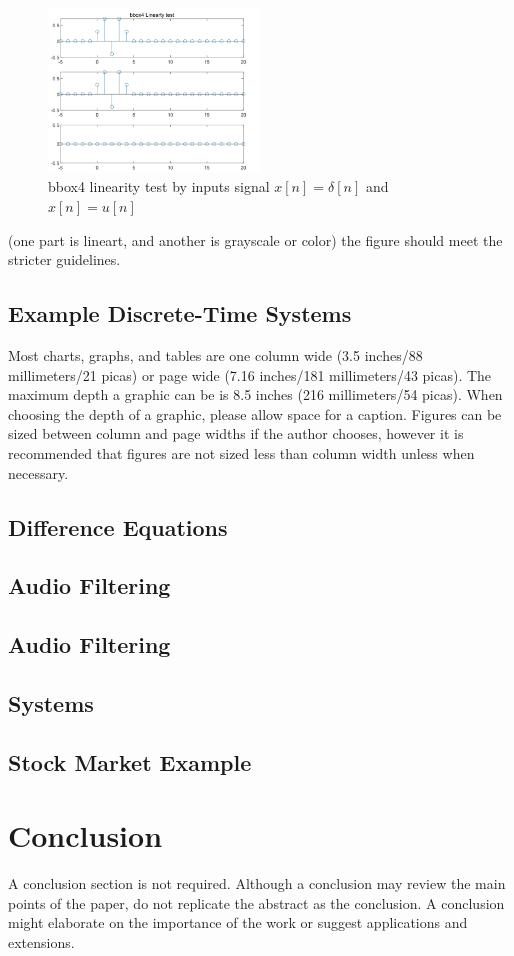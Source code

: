 \documentclass[journal]{IEEEtran}
\begin{document}
 \begin{figure}[htbp]
   \centering
   \includegraphics[width=0.5\textwidth]{bbox4 linear.png} %
   \caption{bbox4 linearity test by inputs signal $x[n]=\delta[n]$ and $x[n]=u[n]$}
   \label{fig:example}
 \end{figure}
 (one part is lineart, and another is grayscale or color) the figure 
should meet the stricter guidelines.







\subsection{Example Discrete-Time Systems}
Most charts, graphs, and tables are one column wide (3.5 inches/88 
millimeters/21 picas) or page wide (7.16 inches/181 millimeters/43 
picas). The maximum depth a graphic can be is 8.5 inches (216 millimeters/54
picas). When choosing the depth of a graphic, please allow space for a 
caption. Figures can be sized between column and page widths if the author 
chooses, however it is recommended that figures are not sized less than 
column width unless when necessary. 

\subsection{Difference Equations}

\subsection{Audio Filtering}
\subsection{Audio Filtering}
\subsection{Systems }
\subsection{Stock Market Example}
\section{Conclusion}

A conclusion section is not required. Although a conclusion may review the main points of the paper, do not replicate the abstract as the conclusion. A conclusion might elaborate on the importance of the work or suggest applications and extensions. 
\end{document}
